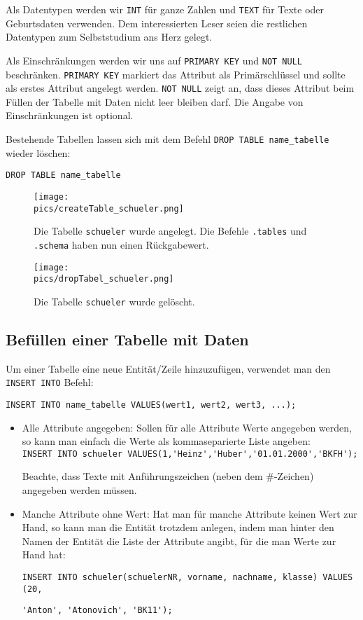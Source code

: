 Als Datentypen werden wir \lstinline!INT! für ganze Zahlen und \lstinline!TEXT! für Texte oder Geburtsdaten verwenden. Dem interessierten Leser seien die restlichen Datentypen zum Selbststudium ans Herz gelegt.

Als Einschränkungen werden wir uns auf \lstinline!PRIMARY KEY! und \lstinline!NOT NULL! beschränken. \lstinline!PRIMARY KEY! markiert das Attribut als Primärschlüssel und sollte als erstes Attribut angelegt werden. \lstinline!NOT NULL! zeigt an, dass dieses Attribut beim Füllen der Tabelle mit Daten nicht leer bleiben darf. Die Angabe von Einschränkungen ist optional.

Bestehende Tabellen lassen sich mit dem Befehl \lstinline!DROP TABLE name_tabelle! wieder löschen:
\begin{tcolorbox}[title=Tabellen löschen]
	\lstinline[breaklines=true]!DROP TABLE name_tabelle !
\end{tcolorbox}
\begin{figure}[h]
	\centering
	\texttt{[image: \\pics/createTable\_schueler.png]}
	\caption*{Die Tabelle \lstinline!schueler! wurde angelegt. Die Befehle \lstinline!.tables! und \lstinline!.schema! haben nun einen Rückgabewert.}
\end{figure}
\begin{figure}[h]
	\centering
	\texttt{[image: \\pics/dropTabel\_schueler.png]}
	\caption*{Die Tabelle \lstinline!schueler! wurde gelöscht.}
\end{figure}

\subsection{Befüllen einer Tabelle mit Daten}
Um einer Tabelle eine neue Entität/Zeile hinzuzufügen, verwendet man den \lstinline!INSERT INTO! Befehl:

\begin{tcolorbox}[title=Befüllen einer Tabelle]
	\lstinline!INSERT INTO name_tabelle VALUES(wert1, wert2, wert3, ...);!
\end{tcolorbox}
\begin{itemize}
	\item Alle Attribute angegeben: Sollen für alle Attribute Werte angegeben werden, so kann man einfach die Werte als kommaseparierte Liste angeben:\\
	\lstinline!INSERT INTO schueler VALUES(1,'Heinz','Huber','01.01.2000','BKFH');!

	Beachte, dass Texte mit Anführungszeichen (neben dem \#-Zeichen) angegeben werden müssen.
	\item Manche Attribute ohne Wert: Hat man für manche Attribute keinen Wert zur Hand, so kann man die Entität trotzdem anlegen, indem man hinter den Namen der Entität die Liste der Attribute angibt, für die man Werte zur Hand hat:

	\lstinline!INSERT INTO schueler(schuelerNR, vorname, nachname, klasse) VALUES (20,!

	\lstinline!'Anton', 'Atonovich', 'BK11');!
\end{itemize}

